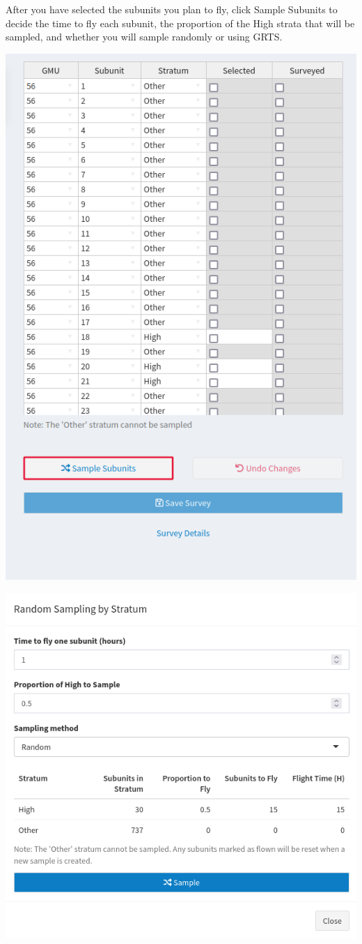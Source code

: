 \documentclass[
]{book}
\begin{document}
After you have selected the subunits you plan to fly, click {Sample Subunits} to decide the time to fly each subunit, the proportion of the High strata that will be sampled, and whether you will sample randomly or using GRTS.

\includegraphics{./www/de_walk8.png}

\includegraphics{./www/de_walk9.png}
\end{document}
